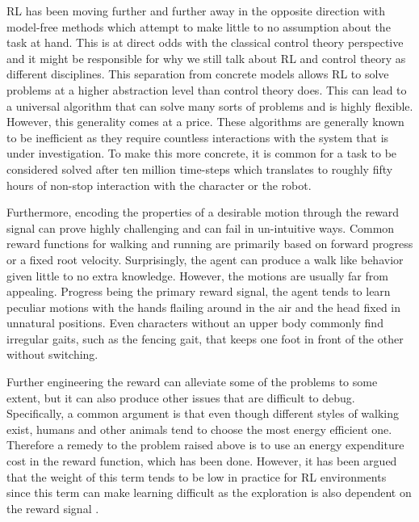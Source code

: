 \ac{RL} has been moving further and further away in the opposite direction with model-free methods which attempt to make little to no assumption about the task at hand.
This is at direct odds with the classical control theory perspective and it might be responsible for why we still talk about \ac{RL} and control theory as different disciplines.
This separation from concrete models allows \ac{RL} to solve problems at a higher abstraction level than control theory does.
This can lead to a universal algorithm that can solve many sorts of problems and is highly flexible.
However, this generality comes at a price. These algorithms are generally known to be inefficient as they require countless interactions with the system that is under investigation.
To make this more concrete, it is common for a task to be considered solved after ten million time-steps which translates to roughly fifty hours of non-stop interaction with the character or the robot.

Furthermore, encoding the properties of a desirable motion through the reward signal can prove highly challenging and can fail in un-intuitive ways.
Common reward functions for walking and running are primarily based on forward progress or a fixed root velocity.
Surprisingly, the agent can produce a walk like behavior given little to no extra knowledge.
However, the motions are usually far from appealing. Progress being the primary reward signal, the agent tends to learn peculiar motions with the hands flailing around in the air and the head fixed in unnatural positions.
Even characters without an upper body commonly find irregular gaits, such as the fencing gait, that keeps one foot in front of the other without switching.

Further engineering the reward
can alleviate some of the problems to some extent, but it can also produce other issues that are difficult to debug.
Specifically, a common argument is that even though different styles of walking exist, humans and other animals tend to choose the most energy efficient one.
Therefore a remedy to the problem raised above is to use an energy expenditure cost in the reward function, which has been done.
However, it has been argued that the weight of this term tends to be low in practice for \ac{RL} environments since this term can make learning difficult as the exploration is also dependent on the reward signal \cite{Yu-SIGGRAPH-2018}.

